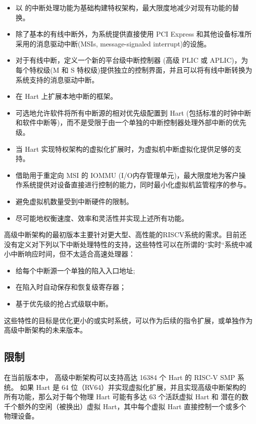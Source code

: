 \begin{translation}
\begin{itemize}
\item 以 {\RISCV} 的中断处理功能为基础构建特权架构，最大限度地减少对现有功能的替换。
\item 除了基本的有线中断外，为{\RISCV}系统提供直接使用 PCI Express 和其他设备标准所采用的消息驱动中断(MSIs, message-signaled interrupt)的设施。
\item 对于有线中断，定义一个新的平台级中断控制器 (高级 PLIC 或 APLIC)，为每个特权级({\RISCV M 和 S 特权级})提供独立的控制界面，并且可以将有线中断转换为系统支持的消息驱动中断。
\item 在{\RISCV} Hart 上扩展本地中断的框架。
\item 可选地允许软件将所有中断源的相对优先级配置到 {\RISCV} Hart (包括标准的时钟中断和软件中断等)，而不是受限于由一个单独的中断控制器处理外部中断的优先级。
\item 当 Hart 实现特权架构的虚拟化扩展时，为虚拟机中断虚拟化提供足够的支持。
\item 借助用于重定向 MSI 的 IOMMU (I/O内存管理单元)，最大限度地为客户操作系统提供对设备直接进行控制的能力，同时最小化虚拟机监管程序的参与。
\item 避免虚拟机数量受到中断硬件的限制。
\item 尽可能地权衡速度、效率和灵活性并实现上述所有功能。

\end{itemize}

高级中断架构的最初版本主要针对更大型、高性能的RISCV系统的需求。目前还没有定义对下列以下中断处理特性的支持，这些特性可以在所谓的“实时“系统中减小中断响应时间，但不太适合高速处理器：

\begin{itemize}
\item 给每个中断源一个单独的陷入入口地址;
\item 在陷入时自动保存和恢复级寄存器；
\item 基于优先级的抢占式级联中断。
\end{itemize}

这些特性的目标是优化更小的或实时系统，可以作为后续的指令扩展，或单独作为高级中断架构的未来版本。

\subsection{限制}

在当前版本中，{\RISCV} 高级中断架构可以支持高达 16384 个 Hart 的 RISC-V SMP 系统。
如果 Hart 是 64 位（RV64）并实现虚拟化扩展，并且实现高级中断架构的所有功能，那么对于每个物理 Hart 可能有多达 63 个活跃虚拟 Hart 和 潜在的数千个额外的空闲（被换出）虚拟 Hart，其中每个虚拟 Hart 直接控制一个或多个物理设备。


\end{translation}
